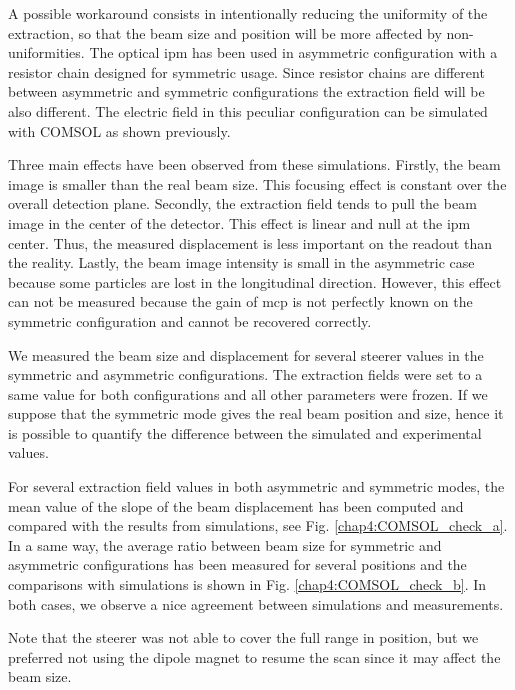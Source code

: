 \begin{refsection}
  A possible workaround consists in intentionally reducing the uniformity of the extraction, so that the beam size and position will be more affected by non-uniformities. The optical \acrshort{ipm} has been used in asymmetric configuration with a resistor chain designed for symmetric usage. Since resistor chains are different between asymmetric and symmetric configurations the extraction field will be also different. The electric field in this peculiar configuration can be simulated with COMSOL as shown previously.

  Three main effects have been observed from these simulations. Firstly, the beam image is smaller than the real beam size. This focusing effect is constant over the overall detection plane. Secondly, the extraction field tends to pull the beam image in the center of the detector. This effect is linear and null at the \acrshort{ipm} center. Thus, the measured displacement is less important on the readout than the reality. Lastly, the beam image intensity is small in the asymmetric case because some particles are lost in the longitudinal direction. However, this effect can not be measured because the gain of \acrshort{mcp} is not perfectly known on the symmetric configuration and cannot be recovered correctly.

  We measured the beam size and displacement for several steerer values in the symmetric and asymmetric configurations.
  The extraction fields were set to a same value for both configurations and all other parameters were frozen. If we suppose that the symmetric mode gives the real beam position and size, hence it is possible to quantify the difference between the simulated and experimental values.
  

  For several extraction field values in both asymmetric and symmetric modes, the mean value of the slope of the beam displacement has been computed and compared with the results from simulations, see Fig. \ref{chap4:COMSOL_check_a}. In a same way, the average ratio between beam size for symmetric and asymmetric configurations has been measured for several positions and the comparisons with simulations is shown in Fig. \ref{chap4:COMSOL_check_b}. In both cases, we observe a nice agreement between simulations and measurements.

  Note that the steerer was not able to cover the full range in position, but we preferred not using the dipole magnet to resume the scan since it may affect the beam size.


\end{refsection}
